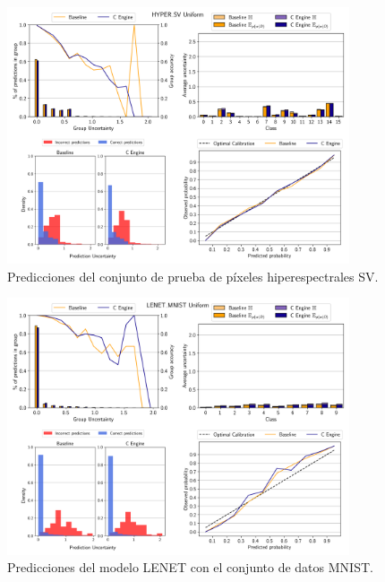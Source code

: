 \begin{figure}[ht]
    \centering
    \includegraphics[width=0.9\textwidth]{root/Imagenes/anexo/Uniform-HYPER_SV-mosaic.png}
    \caption{Predicciones del conjunto de prueba de píxeles hiperespectrales SV.}
    \label{fig:anx-Uniform-HYPER_SV}
\end{figure}


\begin{figure}[ht]
    \centering
    \includegraphics[width=0.9\textwidth]{root/Imagenes/anexo/Uniform-LENET_MNIST-mosaic.png}
    \caption{Predicciones del modelo LENET con el conjunto de datos MNIST.}
    \label{fig:anx-Uniform-LENET_MNIST}
\end{figure}


